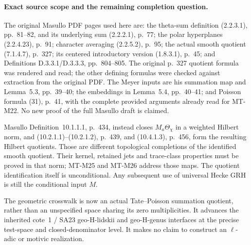 \paragraph{Exact source scope and the remaining completion question.}
The original Masullo PDF pages used here are: the theta-sum
definition (2.2.3.1), pp.~81--82, and its underlying sum (2.2.2.1),
p.~77; the polar hyperplanes (2.2.4.23), p.~91;
character averaging (2.2.5.2), p.~95; the actual smooth quotient
(7.1.4.7), p.~327; its centered introductory version (1.8.3.1),
p.~45; and Definitions D.3.3.1/D.3.3.3, pp.~804--805.
The original p.~327 quotient formula was rendered and read;
the other defining formulas were checked against extraction
from the original PDF. The Meyer inputs are his summation map
and Lemma~5.3, pp.~39--40; the embeddings in Lemma~5.4,
pp.~40--41; and Poisson formula (31), p.~41, with the complete
provided arguments already read for MT-M22. No new proof of
the full Masullo draft is claimed.

Masullo Definition~10.1.1.1, p.~434, instead closes
$M_a\Theta_\chi$ in a weighted Hilbert norm, and
(10.2.1.1)--(10.2.1.2), p.~439, and (10.4.1.3), p.~456,
form the resulting Hilbert quotients. Those are different
topological completions of the identified smooth quotient.
Their kernel, retained jets and trace-class properties must be
proved in that norm; MT-M25 and MT-M26 address those maps.
The quotient identification itself is unconditional. Any
subsequent use of universal Hecke GRH is still the conditional
input $M$.

The geometric crosswalk is now an actual Tate--Poisson
summation quotient, rather than an unspecified space sharing
its zero multiplicities. It advances the inherited cote~1 /
SA23 geo-H-lidskii and geo-H-genus interfaces at the precise
test-space and closed-denominator level. It makes no claim
to construct an $\ell$-adic or motivic realization.

